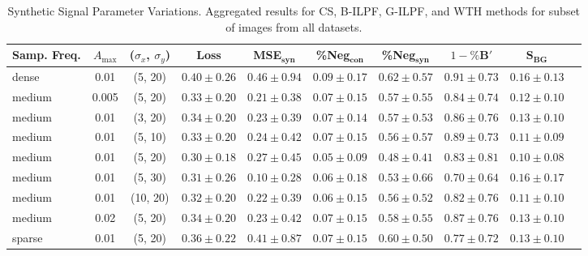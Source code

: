 \begin{table}[h]
\centering
\small
\begin{tabular}{lccccccccr}
\hline
Samp. Freq. & $A_{\mathrm{max}}$  & ($\sigma_x$, $\sigma_y$) & Loss & MSE$_{\mathbf{syn}}$ & \%Neg$_{\mathbf{con}}$ & \%Neg$_{\mathbf{syn}}$ & $1-\%\mathbf{B}'$ & $\mathbf{S}_{\mathbf{BG}}$ \\
\hline
dense & 0.01 & (5, 20) & $0.40 \pm 0.26$ & $0.46 \pm 0.94$ & $0.09 \pm 0.17$ & $0.62 \pm 0.57$ & $0.91 \pm 0.73$ & $0.16 \pm 0.13$  \\
medium & 0.005 & (5, 20) & $0.33 \pm 0.20$ & $0.21 \pm 0.38$ & $0.07 \pm 0.15$ & $0.57 \pm 0.55$ & $0.84 \pm 0.74$ & $0.12 \pm 0.10$ \\
medium & 0.01 & (3, 20) & $0.34 \pm 0.20$ & $0.23 \pm 0.39$ & $0.07 \pm 0.14$ & $0.57 \pm 0.53$ & $0.86 \pm 0.76$ & $0.13 \pm 0.10$ \\
medium & 0.01 & (5, 10) & $0.33 \pm 0.20$ & $0.24 \pm 0.42$ & $0.07 \pm 0.15$ & $0.56 \pm 0.57$ & $0.89 \pm 0.73$ & $0.11 \pm 0.09$ \\
medium & 0.01 & (5, 20) & $0.30 \pm 0.18$ & $0.27 \pm 0.45$ & $0.05 \pm 0.09$ & $0.48 \pm 0.41$ & $0.83 \pm 0.81$ & $0.10 \pm 0.08$ \\
medium & 0.01 & (5, 30) & $0.31 \pm 0.26$ & $0.10 \pm 0.28$ & $0.06 \pm 0.18$ & $0.53 \pm 0.66$ & $0.70 \pm 0.64$ & $0.16 \pm 0.17$ \\
medium & 0.01 & (10, 20) & $0.32 \pm 0.20$ & $0.22 \pm 0.39$ & $0.06 \pm 0.15$ & $0.56 \pm 0.52$ & $0.82 \pm 0.76$ & $0.11 \pm 0.10$ \\
medium & 0.02 & (5, 20) & $0.34 \pm 0.20$ & $0.23 \pm 0.42$ & $0.07 \pm 0.15$ & $0.58 \pm 0.55$ & $0.87 \pm 0.76$ & $0.13 \pm 0.10$ \\
sparse & 0.01 & (5, 20) & $0.36 \pm 0.22$ & $0.41 \pm 0.87$ & $0.07 \pm 0.15$ & $0.60 \pm 0.50$ & $0.77 \pm 0.72$ & $0.13 \pm 0.10$ \\
\hline
\end{tabular}
\caption{Synthetic Signal Parameter Variations. Aggregated results for CS, B-ILPF, G-ILPF, and WTH methods for subset of images from all datasets.}
\label{tab:synthetic_variations}
\end{table}



